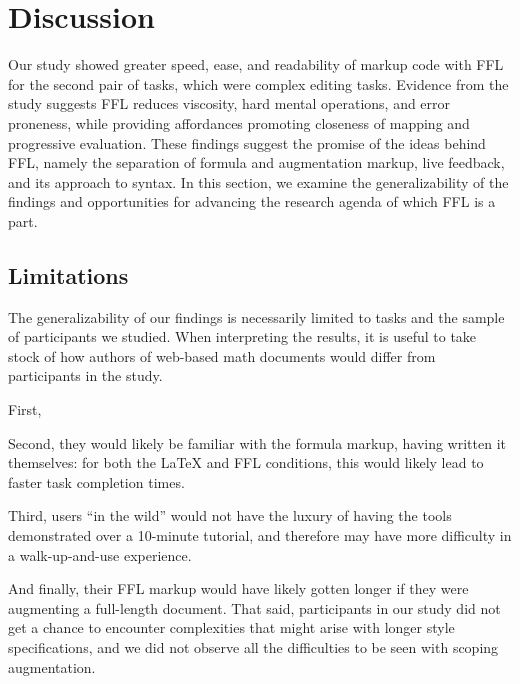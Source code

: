 \section{Discussion}

Our study showed greater speed, ease, and readability of markup code with FFL for the second pair of tasks, which were complex editing tasks. Evidence from the study suggests FFL reduces viscosity, hard mental operations, and error proneness, while providing affordances promoting closeness of mapping and progressive evaluation. These findings suggest the promise of the ideas behind FFL, namely the separation of formula and augmentation markup, live feedback, and its approach to syntax. In this section, we examine the generalizability of the findings and opportunities for advancing the research agenda of which FFL is a part.

\subsection{Limitations}

The generalizability of our findings is necessarily limited to tasks and the sample of participants we studied. When interpreting the results, it is useful to take stock of how authors of web-based math documents would differ from participants in the study.

First, 

Second, they would likely be familiar with the formula markup, having written it themselves: for both the LaTeX and FFL conditions, this would likely lead to faster task completion times.

Third, users ``in the wild'' would not have the luxury of having the tools demonstrated over a 10-minute tutorial, and therefore may have more difficulty in a walk-up-and-use experience.

And finally, their FFL markup would have likely gotten longer if they were augmenting a full-length document.
That said, participants in our study did not get a chance to encounter complexities that might arise with longer style specifications, and we did not observe all the difficulties to be seen with scoping augmentation.

